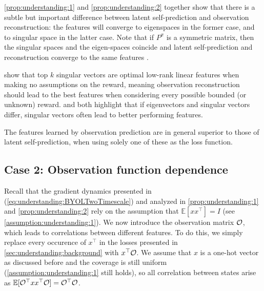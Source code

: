 \autoref{prop:understanding:1} and \autoref{prop:understanding:2} together show that there is a subtle but important difference between latent self-prediction and observation reconstruction: the features will converge to eigenspaces in the former case, and to singular space in the latter case.
Note that if $P^\pi$ is a symmetric matrix, then the singular spaces and the eigen-spaces coincide and latent self-prediction and reconstruction converge to the same features \parencite{tang2022understanding}.

\textcite{behzadian2019fast} show that top $k$ singular vectors are optimal low-rank linear features when making no assumptions on the reward, meaning observation reconstruction should lead to the best features when considering every possible bounded (or unknown) reward.
\textcite{behzadian2019fast} and \textcite{lelan2023bootstrapped} both highlight that if eigenvectors and singular vectors differ, singular vectors often lead to better performing features.

\begin{tcolorbox}[boxrule=0.2mm,colback=white,colframe=uoftblue,boxsep=0pt,top=3pt,bottom=5pt]
\begin{insight} The features learned by observation prediction are in general superior to those of latent self-prediction, when using solely one of these as the loss function.
\label{insight:understanding:1}
\end{insight}
\end{tcolorbox}

\subsection{Case 2: Observation function dependence}
\label{sec:understanding:observation}

Recall that the gradient dynamics presented in (\ref{eq:understanding:BYOLTwoTimescale}) and analyzed in \autoref{prop:understanding:1} and \autoref{prop:understanding:2} rely on the assumption that $\mathbb{E}[xx^\top] = I$ (see \autoref{assumption:understanding:1}).
We now introduce the observation matrix ${\mathcal{O}}$, which leads to correlations between different features.
To do this, we simply replace every occurence of $x^\top$ in the losses presented in \autoref{sec:understanding:background} with $x^\top {\mathcal{O}}$.
We assume that $x$ is a one-hot vector as discussed before and the coverage is still uniform (\autoref{assumption:understanding:1} still holds), so all correlation between states arise as $\mathbb{E}[{\mathcal{O}}^\top x x^\top{\mathcal{O}}] = {\mathcal{O}}^\top {\mathcal{O}}$.

